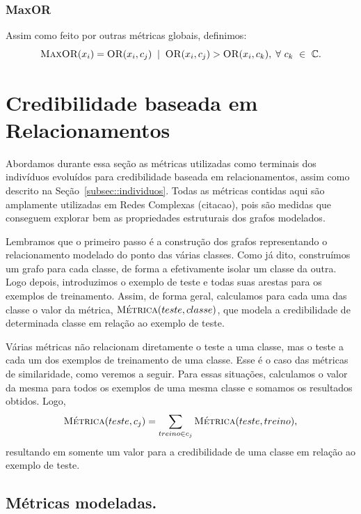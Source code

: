 \subsubsection{MaxOR}
\label{subsubsection::maxor}
Assim como feito por outras métricas globais, definimos:
\begin{equation}\label{eqn::maxor}
\textsc{MaxOR}(x_i) = \textsc{OR}(x_i,c_j) \; \; | \;\; \textsc{OR}(x_i, c_j) > \textsc{OR}(x_i, c_k), \; \forall\ c_k\ \in\ \mathbb{C}.
\end{equation}


\section{Credibilidade baseada em Relacionamentos}
\label{sec::pg_cred_baseada_grafos}

Abordamos durante essa seção as métricas utilizadas como terminais dos indivíduos evoluídos para credibilidade baseada em relacionamentos, assim como descrito na Seção~\ref{subsec::individuos}. Todas as métricas contidas aqui são amplamente utilizadas em Redes Complexas (citacao), pois são medidas que conseguem explorar bem as propriedades estruturais dos grafos modelados.

Lembramos que o primeiro passo é a construção dos grafos representando o relacionamento modelado do ponto das várias classes. 
Como já dito, construímos um grafo para cada classe, de forma a efetivamente isolar um classe da outra.
Logo depois, introduzimos o exemplo de teste e todas suas arestas para os exemplos de treinamento. Assim, de forma geral, calculamos para cada uma das classe o valor da métrica, $\textsc{Métrica}(teste, classe)$, que modela a credibilidade de determinada classe em relação ao exemplo de teste. 

Várias métricas não relacionam diretamente o teste a uma classe, mas o teste a cada um dos exemplos de treinamento de uma classe. Esse é o caso das métricas de similaridade, como veremos a seguir. Para essas situações, calculamos o valor da mesma para todos os exemplos de uma mesma classe e somamos os resultados obtidos. Logo,
\begin{equation}
         \textsc{Métrica}(teste, c_j) =  \sum\limits_{treino \in c_j} \textsc{Métrica}(teste, treino),
\end{equation}
resultando em somente um valor para a credibilidade de uma classe em relação ao exemplo de teste.

\subsection{Métricas modeladas.}
\label{subsec::pg_metricas_grafos}


